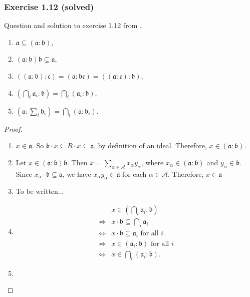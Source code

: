 \subsubsection{\cite{AtiyahMacdonald} Exercise 1.12 (solved)}
Question and solution to exercise 1.12 from \cite{AtiyahMacdonald}.
\begin{exercise*}
    \begin{enumerate}[label=\roman*)]
        \item \(\mathfrak{a} \subseteq (\mathfrak{a}:\mathfrak{b})\),
        \item \((\mathfrak{a}:\mathfrak{b}) \mathfrak{b} \subseteq \mathfrak{a}\),
        \item \(\left((\mathfrak{a}:\mathfrak{b}): \mathfrak{c}\right) = (\mathfrak{a}:\mathfrak{bc}) = \left((\mathfrak{a}:\mathfrak{c}): \mathfrak{b}\right)\),
        \item \(\left(\bigcap_{i} \mathfrak{a}_i: \mathfrak{b}\right) = \bigcap_{i} (\mathfrak{a}_i: \mathfrak{b})\),
        \item \(\left(\mathfrak{a}: \sum_{i} \mathfrak{b}_i \right) = \bigcap_{i} (\mathfrak{a}: \mathfrak{b}_i)\).
    \end{enumerate}
\end{exercise*}
\begin{proof}
    \begin{enumerate}[label=\roman*)]
        \item \(x \in \mathfrak{a}\). So \(\mathfrak{b} \cdot x \subseteq R \cdot x \subseteq \mathfrak{a}\), by definition of an ideal.  Therefore, \(x \in (\mathfrak{a}: \mathfrak{b})\).

        \item Let  \(x \in (\mathfrak{a}: \mathfrak{b})\mathfrak{b}\). Then  \(x = \sum_{\alpha \in \mathcal{A}}x_\alpha y_\alpha\), where \(x_\alpha \in (\mathfrak{a}: \mathfrak{b})\) and \(y_\alpha \in \mathfrak{b}\). Since \(x_\alpha \cdot \mathfrak{b} \subseteq \mathfrak{a}\), we have \(x_\alpha y_\alpha \in \mathfrak{a}\) for each \(\alpha \in \mathcal{A}\). Therefore, \(x \in \mathfrak{a}\)

        \item To be written...

        \item \begin{align*}
        &x \in \left(\bigcap_{i} \mathfrak{a}_i: \mathfrak{b}\right)\\
        \Longleftrightarrow& x \cdot \mathfrak{b} \subseteq \bigcap_i \mathfrak{a}_i\\
        \Longleftrightarrow& x \cdot \mathfrak{b} \subseteq \mathfrak{a}_i \text{ for all } i\\
        \Longleftrightarrow& x \in (\mathfrak{a}_i : \mathfrak{b}) \text{ for all } i\\
        \Longleftrightarrow& x \in  \bigcap_i (\mathfrak{a}_i: \mathfrak{b}) 
    .\end{align*}
        \item {}
    \end{enumerate}
    \end{proof}
